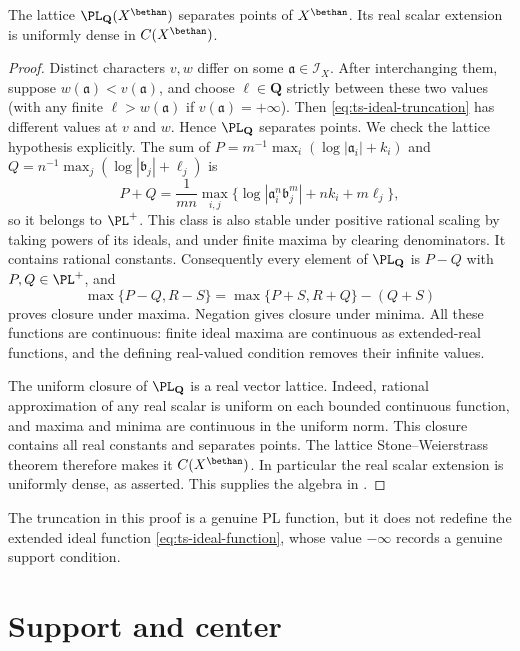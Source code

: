 \begin{proposition}\label{prop:ts-pl-density}
The lattice $\PL_{\mathbf Q}(X^\bethan)$ separates points of
$X^\bethan$.  Its real scalar extension is uniformly dense in
$C(X^\bethan)$.
\end{proposition}

\begin{proof}
Distinct characters $v,w$ differ on some
$\mathfrak a\in\mathscr I_X$.  After interchanging them, suppose
$w(\mathfrak a)<v(\mathfrak a)$, and choose
$\ell\in\mathbf Q$ strictly between these two values (with any finite
$\ell>w(\mathfrak a)$ if $v(\mathfrak a)=+\infty$).
Then \eqref{eq:ts-ideal-truncation} has different values at $v$ and $w$.
Hence $\PL_{\mathbf Q}$ separates points.
We check the lattice hypothesis explicitly. The sum of
$P=m^{-1}\max_i(\log|\mathfrak a_i|+k_i)$ and
$Q=n^{-1}\max_j(\log|\mathfrak b_j|+\ell_j)$ is
\[
 P+Q=\frac1{mn}\max_{i,j}
   \{\log|\mathfrak a_i^n\mathfrak b_j^m|+nk_i+m\ell_j\},
\tag{58.13b}\label{eq:ts-pl-addition}
\]
so it belongs to $\PL^+$. This class is also stable under positive
rational scaling by taking powers of its ideals, and under finite
maxima by clearing denominators. It contains rational constants.
Consequently every element of $\PL_{\mathbf Q}$ is $P-Q$ with
$P,Q\in\PL^+$, and
\[
 \max\{P-Q,R-S\}=\max\{P+S,R+Q\}-(Q+S)
\tag{58.13c}\label{eq:ts-pl-lattice-identity}
\]
proves closure under maxima. Negation gives closure under minima.
All these functions are continuous: finite ideal maxima are continuous
as extended-real functions, and the defining real-valued condition
removes their infinite values.

The uniform closure of $\PL_{\mathbf Q}$ is a real vector lattice.
Indeed, rational approximation of any real scalar is uniform on each
bounded continuous function, and maxima and minima are continuous in
the uniform norm. This closure contains all real constants and separates
points. The lattice Stone--Weierstrass theorem therefore makes it
$C(X^\bethan)$. In particular the real scalar extension is uniformly
dense, as asserted. This supplies the algebra in
\cite[Proposition~1.4.4]{MPTropicalV2}.
\end{proof}

The truncation in this proof is a genuine PL function, but it does not
redefine the extended ideal function
\eqref{eq:ts-ideal-function}, whose value $-\infty$ records a genuine
support condition.

\section{Support and center}
\label{sec:ts-support}

